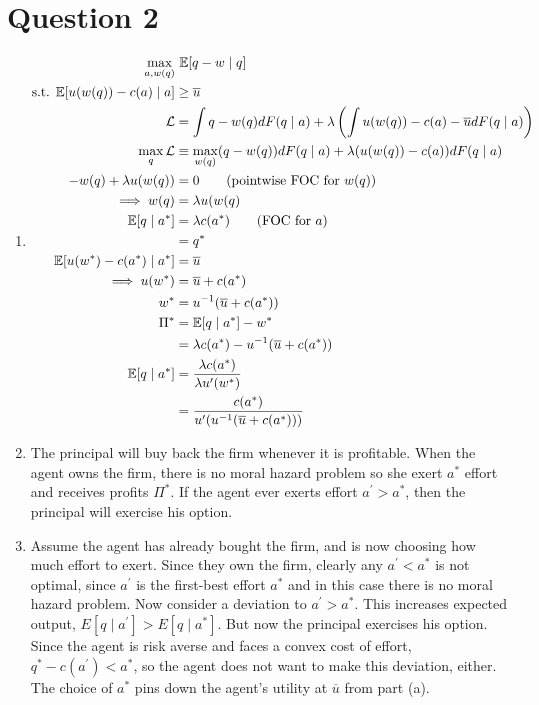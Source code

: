 \section{Question 2}
\begin{enumerate}[label=\alph*)]
\item  
  \begin{align*}
    \max_{a, w(q)}&\ \mathbb{E}[q - w \mid q]\\
    \text{s.t. } \mathbb{E}[u(w(q)) - c(a) \mid a] &\ge \overline{u}\\
    \mathcal{L} &= \int q - w(q) dF(q \mid a) + \lambda \left(\int u (w(q)) - c(a) - \overline{u} dF(q \mid a)\right)\\
    \max_{q} \mathcal{L} &\equiv \max_{w(q)} (q - w(q)) dF(q \mid a) + \lambda (u(w(q)) - c(a))dF(q \mid a )\\
    -w(q) + \lambda u (w(q)) &= 0 \tag{pointwise FOC for $w(q)$}\\
    \implies w(q) &= \lambda u(w(q)\\
    \mathbb{E}[q \mid a^\ast] &= \lambda c(a^\ast) \tag{FOC for $a$}\\
                  &= q^\ast\\
    \mathbb{E}[u(w^\ast) - c(a^\ast) \mid a^\ast] &= \overline{u}\\
    \implies u(w^\ast) &= \overline{u} + c(a^\ast)\\
    w^\ast &= u^{-1} (\overline{u} + c(a^\ast))\\
    \Pi^\ast &= \mathbb{E}[q \mid a^\ast] - w^\ast\\
    &= \lambda c(a^\ast) - u^{-1} (\overline{u} + c(a^\ast))\\
    \mathbb{E}[q \mid a^\ast] &= \frac{\lambda c(a^\ast)}{\lambda u^\prime (w^\ast)}\\
    &= \frac{c(a^\ast)}{u^\prime(u^{-1}(\overline{u} + c(a^\ast)))}
  \end{align*}
\item
  The principal will buy back the firm whenever it is profitable. When the agent owns the firm, there is no moral hazard problem so she exert $a^\ast$ effort and receives profits $\Pi^\ast$. If the agent ever exerts effort $a^\prime > a^\ast$, then the principal will exercise his option.

  \item Assume the agent has already bought the firm, and is now choosing how much effort to exert. Since they own the firm, clearly any $a^\prime < a^\ast$ is not optimal, since $a^\prime$ is the first-best effort $a^\ast$ and in this case there is no moral hazard problem. Now consider a deviation to $a^\prime > a^\ast$. This increases expected output, $E[q \mid a^\prime] > E[q \mid a^\ast]$. But now the principal exercises his option. Since the agent is risk averse and faces a convex cost of effort, $q^\ast - c(a^\prime) < a^\ast$, so the agent does not want to make this deviation, either. The choice of $a^\ast$ pins down the agent's utility at $\overline{u}$ from part (a).
\end{enumerate}
